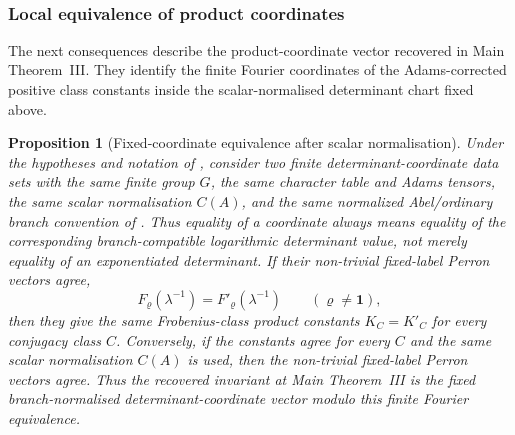 \documentclass[11pt,a4paper]{amsart}
\theoremstyle{plain}
\newtheorem{proposition}[theorem]{Proposition}
\theoremstyle{definition}
\theoremstyle{remark}
\begin{document}
﻿
\subsubsection{Local equivalence of product coordinates}
\label{subsubsec:class-product-local-observation}

The next consequences describe the product-coordinate vector recovered in
Main Theorem~III.  They identify the finite Fourier coordinates of the
Adams-corrected positive class constants inside the scalar-normalised
determinant chart fixed above.

\begin{proposition}[Fixed-coordinate equivalence after scalar normalisation]
  \label{prop:class-product-fixed-coordinate-equivalence}
  Under the hypotheses and notation of
  , consider two finite
  determinant-coordinate data sets with the same finite group \(G\), the same
  character table and Adams tensors, the same scalar normalisation \(C(A)\),
  and the same normalized Abel/ordinary branch convention of
  .  Thus equality of a coordinate
  always means equality of the corresponding branch-compatible logarithmic
  determinant value, not merely equality of an exponentiated determinant.  If
  their non-trivial fixed-label Perron vectors agree,
  \[
    F_\varrho(\lambda^{-1})=F'_\varrho(\lambda^{-1})
    \qquad(\varrho\ne\mathbf1),
  \]
  then they give the same Frobenius-class product constants \(K_C=K'_C\) for
  every conjugacy class \(C\).  Conversely, if the constants agree for every
  \(C\) and the same scalar normalisation \(C(A)\) is used, then the
  non-trivial fixed-label Perron vectors agree.  Thus the recovered invariant
  at Main Theorem~III is the fixed branch-normalised determinant-coordinate
  vector modulo this finite Fourier equivalence.
\end{proposition}
\end{document}

